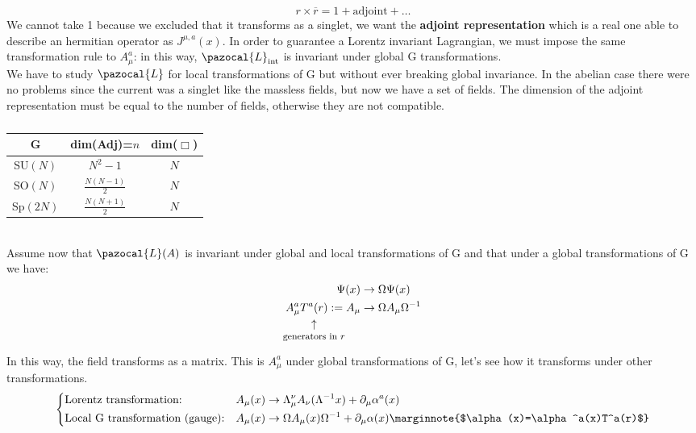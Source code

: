 \documentclass[../main.tex]{subfiles}
\begin{document}
\[
r\times\overline{r}=1+\text{adjoint}+\dots
\]
We cannot take 1 because we excluded that it transforms as a singlet, we want the \textbf{adjoint representation} which is a real one able to describe an hermitian operator as $J^{\mu,a}(x)$. In order to guarantee a Lorentz invariant Lagrangian, we must impose the same transformation rule to $A_\mu^a$: in this way, $\pazocal{L}_{\text{int}}$ is invariant under global G transformations.\\
We have to study $\pazocal{L}$ for local transformations of G but without ever breaking global invariance. In the abelian case there were no problems since the current was a singlet like the massless fields, but now we have a set of fields. The dimension of the adjoint representation must be equal to the number of fields, otherwise they are not compatible.
\begin{table}[h]
    \centering
    \begin{tabular}{ccc}
    G & dim(Adj)=$n$ & dim($\Box$) \\
    \hline
    SU$(N)$ & $N^2-1$ & $N$ \\
    SO$(N)$ & $\frac{N(N-1)}{2}$ & $N$ \\
    Sp$(2N)$ & $\frac{N(N+1)}{2}$ & $N$ \\
    \hline
    \end{tabular}
    \caption*{}
    \label{tab:my_label}
\end{table}\\
Assume now that $\pazocal{L}(A)$ is invariant under global and local transformations of G and that under a global transformations of G we have:
\begin{align*}
\Psi(x)&\to\Omega\Psi(x)\\
A_\mu^a\underset{\mathclap{\tikz \node {$\uparrow$} node [below=1ex] {\footnotesize  generators in $r$};}}{T^a(r)}:=A_\mu&\to\Omega A_\mu\Omega^{-1}
\end{align*}
In this way, the field transforms as a matrix. This is $A_\mu^a$ under global transformations of G, let's see how it transforms under other transformations.
\[
\left\{
\begin{aligned}
&\text{Lorentz transformation:} &&A_\mu(x)\to\Lambda_\mu^\nu A_\nu(\Lambda^{-1}x)+\partial_\mu\alpha^a(x)\\
&\text{Local G transformation (gauge):} &&A_\mu(x)\to\Omega A_\mu(x)\Omega^{-1}+\partial_\mu\alpha(x)\marginnote{$\alpha(x)=\alpha^a(x)T^a(r)$}
\end{aligned}
\right.
\]
\end{document}
